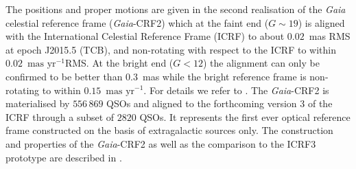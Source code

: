 \documentclass[longauth]{aa_gaia} %
\newcommand\gaia{\textit{Gaia}}
\newcommand\gaiacrftwo{\gaia-CRF2}
\newcommand\gdrtwoicrfthree{\ensuremath{2820}}
\newcommand\gdrtwogaiacrftwo{\ensuremath{556\,869}}
\newcommand\masyr{\ensuremath{\text{mas~yr}^{-1}}}
\begin{document}
The positions and proper motions are given in the second realisation of the {\gaia} celestial
reference frame (\gaiacrftwo) which at the faint end ($G\sim19$) is aligned with the International
Celestial Reference Frame (ICRF) to about $0.02$~mas RMS at epoch J2015.5 (TCB), and non-rotating with
respect to the ICRF to within $0.02$~\masyr RMS. At the bright end ($G<12$) the alignment can only be
confirmed to be better than $0.3$~mas while the bright reference frame is non-rotating to within
$0.15$~\masyr. For details we refer to \cite{DR2-DPACP-51}. The {\gaiacrftwo} is materialised by
{\gdrtwogaiacrftwo} QSOs and aligned to the forthcoming version 3 of the ICRF through a subset of
{\gdrtwoicrfthree} QSOs. It represents the first ever optical reference frame constructed on the
basis of extragalactic sources only. The construction and properties of the {\gaiacrftwo} as well as
the comparison to the ICRF3 prototype are described in \cite{DR2-DPACP-30}.
\end{document}
